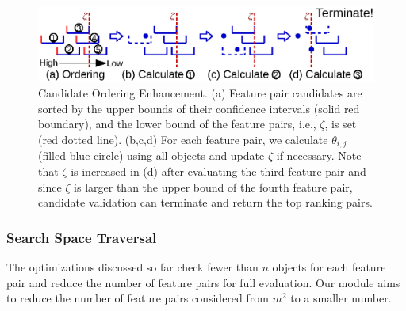 \begin{figure}[h]
 \centering
 \vspace{-6.5mm}
 \includegraphics[width=0.9\linewidth]{fig/candidate_ordering.eps}
 \vspace{-6mm}
\caption{Candidate Ordering Enhancement. (a) Feature pair candidates are sorted by the upper bounds of their confidence intervals (solid red boundary), and the lower bound of the \topthree feature pairs, i.e., $\zeta$, is set (red dotted line). (b,c,d) For each feature pair, we calculate $\theta_{i,j}$ (filled blue circle) using all objects and update $\zeta$ if necessary. Note that $\zeta$ is increased in (d) after evaluating the third feature pair and since $\zeta$ is larger than the upper bound of the fourth feature pair, candidate validation can terminate and return the top ranking pairs.}
\vspace{-5mm}
\label{fig:candidate_ordering}
\end{figure}

\subsubsection{Search Space Traversal} \label{ssec:traversal}

The optimizations discussed so far check fewer
than $n$ objects for each feature pair and reduce
the number of feature pairs
for full evaluation. Our \traversal module
aims to reduce the number of feature pairs
considered from $m^2$ to a smaller number.


